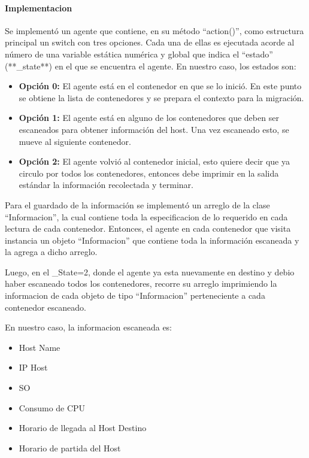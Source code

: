 \documentclass[11pt]{article}
\providecommand{\tightlist}{%
      \setlength{\itemsep}{0pt}\setlength{\parskip}{0pt}}
\begin{document}
    \hypertarget{implementacion}{%
\paragraph{Implementacion}\label{implementacion}}

Se implementó un agente que contiene, en su método ``action()'', como
estructura principal un switch con tres opciones. Cada una de ellas es
ejecutada acorde al número de una variable estática numérica y global
que indica el ``estado'' (**\_state**) en el que se encuentra el agente.
En nuestro caso, los estados son:

\begin{itemize}
\item
  \textbf{Opción 0:} El agente está en el contenedor en que se lo
  inició. En este punto se obtiene la lista de contenedores y se prepara
  el contexto para la migración.
\item
  \textbf{Opción 1:} El agente está en alguno de los contenedores que
  deben ser escaneados para obtener información del host. Una vez
  escaneado esto, se mueve al siguiente contenedor.
\item
  \textbf{Opción 2:} El agente volvió al contenedor inicial, esto quiere
  decir que ya circulo por todos los contenedores, entonces debe
  imprimir en la salida estándar la información recolectada y terminar.
\end{itemize}

Para el guardado de la información se implementó un arreglo de la clase
``Informacion'', la cual contiene toda la especificacion de lo requerido
en cada lectura de cada contenedor. Entonces, el agente en cada
contenedor que visita instancia un objeto ``Informacion'' que contiene
toda la información escaneada y la agrega a dicho arreglo.

Luego, en el \_State=2, donde el agente ya esta nuevamente en destino y
debio haber escaneado todos los contenedores, recorre su arreglo
imprimiendo la informacion de cada objeto de tipo ``Informacion''
perteneciente a cada contenedor escaneado.

En nuestro caso, la informacion escaneada es:

\begin{itemize}
\tightlist
\item
  Host Name
\item
  IP Host
\item
  SO
\item
  Consumo de CPU
\item
  Horario de llegada al Host Destino
\item
  Horario de partida del Host
\end{itemize}
\end{document}
